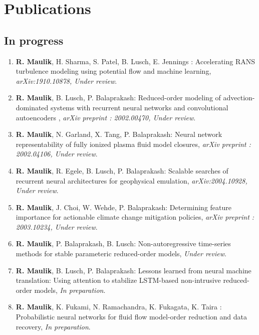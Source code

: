 \documentclass[letterpaper]{article}
\begin{document}
\section*{Publications}

\subsection*{In progress}

\begin{enumerate}

\item \textbf{R. Maulik}, H. Sharma, S. Patel, B. Lusch, E. Jennings : Accelerating RANS turbulence modeling using potential flow and machine learning, {\it arXiv:1910.10878, Under review}.

\item \textbf{R. Maulik}, B. Lusch, P. Balaprakash: Reduced-order modeling of advection-dominated systems with recurrent neural networks and convolutional autoencoders , {\it arXiv preprint : 2002.00470, Under review}.

\item \textbf{R. Maulik}, N. Garland, X. Tang, P. Balaprakash: Neural network representability of fully ionized plasma fluid model closures, {\it arXiv preprint : 2002.04106, Under review}.

\item \textbf{R. Maulik}, R. Egele, B. Lusch,  P. Balaprakash: Scalable searches of recurrent neural architectures for geophysical emulation, {\it arXiv:2004.10928, Under review}.

\item \textbf{R. Maulik}, J. Choi,  W. Wehde, P. Balaprakash: Determining feature importance for actionable climate change mitigation policies, {\it arXiv preprint : 2003.10234, Under review}.

\item \textbf{R. Maulik}, P. Balaprakash, B. Lusch: Non-autoregressive time-series methods for stable parameteric reduced-order models, {\it Under review}.

\item \textbf{R. Maulik}, B. Lusch, P. Balaprakash: Lessons learned from neural machine translation: Using attention to stabilize LSTM-based non-intrusive reduced-order models, {\it In preparation}.

\item \textbf{R. Maulik}, K. Fukami, N. Ramachandra, K. Fukagata, K. Taira : Probabilistic neural networks for fluid flow model-order reduction and data recovery, {\it In preparation}.


\end{enumerate}
\end{document}
